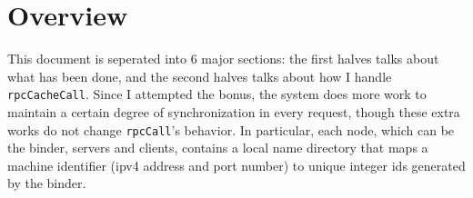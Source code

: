 \section*{Overview}
This document is seperated into 6 major sections: the first halves talks about what has been done, and the second halves talks about how I handle {\tt rpcCacheCall}.
Since I attempted the bonus, the system does more work to maintain a certain degree of synchronization in every request, though these extra works do not change {\tt rpcCall}'s behavior.
In particular, each node, which can be the binder, servers and clients, contains a local name directory that maps a machine identifier (ipv4 address and port number) to unique integer ids generated by the binder.
